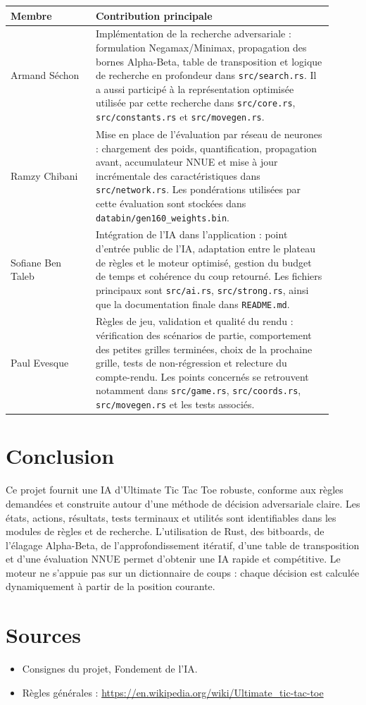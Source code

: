 \documentclass{pssbmac}
\begin{document}
\begin{center}
\small
\begin{tabular}{p{0.24\linewidth}p{0.67\linewidth}}
\hline
\rowcolor{TableHeader}
\textbf{Membre} & \textbf{Contribution principale} \\
\hline
Armand Séchon & Implémentation de la recherche adversariale : formulation Negamax/Minimax, propagation des bornes Alpha-Beta, table de transposition et logique de recherche en profondeur dans \texttt{src/search.rs}. Il a aussi participé à la représentation optimisée utilisée par cette recherche dans \texttt{src/core.rs}, \texttt{src/constants.rs} et \texttt{src/movegen.rs}. \\
Ramzy Chibani & Mise en place de l'évaluation par réseau de neurones : chargement des poids, quantification, propagation avant, accumulateur NNUE et mise à jour incrémentale des caractéristiques dans \texttt{src/network.rs}. Les pondérations utilisées par cette évaluation sont stockées dans \texttt{databin/gen160\_weights.bin}. \\
Sofiane Ben Taleb & Intégration de l'IA dans l'application : point d'entrée public de l'IA, adaptation entre le plateau de règles et le moteur optimisé, gestion du budget de temps et cohérence du coup retourné. Les fichiers principaux sont \texttt{src/ai.rs}, \texttt{src/strong.rs}, ainsi que la documentation finale dans \texttt{README.md}. \\
Paul Evesque & Règles de jeu, validation et qualité du rendu : vérification des scénarios de partie, comportement des petites grilles terminées, choix de la prochaine grille, tests de non-régression et relecture du compte-rendu. Les points concernés se retrouvent notamment dans \texttt{src/game.rs}, \texttt{src/coords.rs}, \texttt{src/movegen.rs} et les tests associés. \\
\hline
\end{tabular}
\end{center}

\section{Conclusion}

Ce projet fournit une IA d'Ultimate Tic Tac Toe robuste, conforme aux règles demandées et construite autour d'une méthode de décision adversariale claire. Les états, actions, résultats, tests terminaux et utilités sont identifiables dans les modules de règles et de recherche. L'utilisation de Rust, des bitboards, de l'élagage Alpha-Beta, de l'approfondissement itératif, d'une table de transposition et d'une évaluation NNUE permet d'obtenir une IA rapide et compétitive. Le moteur ne s'appuie pas sur un dictionnaire de coups : chaque décision est calculée dynamiquement à partir de la position courante.

\section*{Sources}

\begin{itemize}
    \item Consignes du projet, Fondement de l'IA.
    \item Règles générales : \url{https://en.wikipedia.org/wiki/Ultimate_tic-tac-toe}
\end{itemize}
\end{document}
